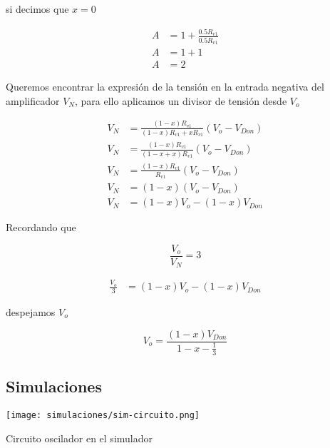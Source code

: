 si decimos que $x=0$ 

\begin{align*}
    A &= 1 + \frac{0.5 R_{v1}}{0.5 R_{v1}} \\
    A &= 1 + 1 \\
    A &= 2
\end{align*}

Queremos encontrar la expresión de la tensión en la entrada negativa del amplificador $V_N$, para ello aplicamos un divisor de tensión desde $V_o$

\begin{align*}
    V_N &= \frac{(1-x)R_{v1}}{(1-x)R_{v1} + x R_{v1}}(V_o - V_{Don}) \\
    V_N &= \frac{(1-x)R_{v1}}{(1-x +x)R_{v1}}(V_o - V_{Don})\\
    V_N &= \frac{(1-x)R_{v1}}{R_{v1}}(V_o - V_{Don}) \\
    V_N &= (1-x)(V_o - V_{Don}) \\
    V_N &= (1-x)V_o - (1-x)V_{Don} 
\end{align*}

Recordando que 

\begin{equation}
    \frac{V_o}{V_N} = 3
\end{equation}

\begin{align*}
    \frac{V_o}{3} &= (1-x)V_o - (1-x)V_{Don} 
\end{align*}

despejamos $V_o$

\begin{equation}
    V_o = \frac{(1-x)V_{Don}}{1-x - \frac{1}{3}}
\end{equation}

\paragraph{}

\FloatBarrier
\subsection{Simulaciones}

\begin{ilustracion}[hb]
    \centering
    \texttt{[image: simulaciones/sim-circuito.png]}
    \caption{Circuito oscilador en el simulador}
    \label{ilus:simulacion-circuito}
\end{ilustracion}

